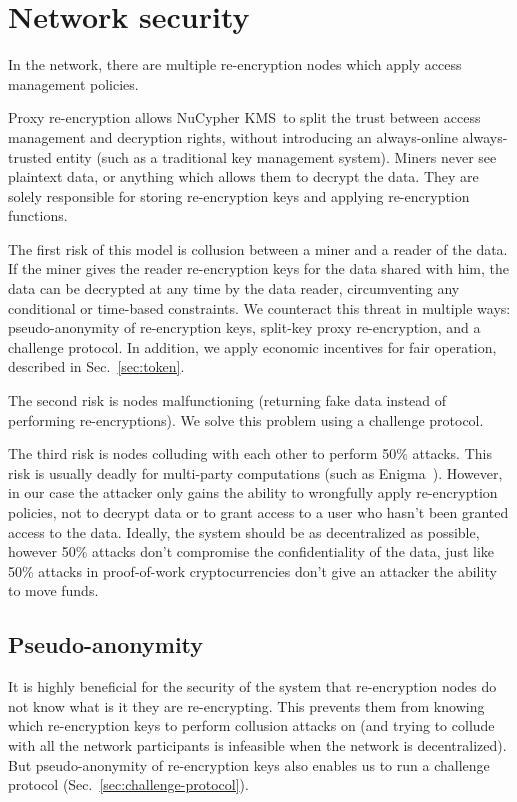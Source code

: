 \documentclass[longbibliography]{revtex4-1}
\newcommand{\kms}{NuCypher KMS}
\begin{document}
\section{Network security}

In the network, there are multiple re-encryption nodes which apply access management policies.

Proxy re-encryption allows \kms~to split the trust between access management and decryption rights,
without introducing an always-online always-trusted entity (such as a traditional key management system).
Miners never see plaintext data, or anything which allows them to decrypt the data.
They are solely responsible for storing re-encryption keys and applying re-encryption functions.

The first risk of this model is collusion between a miner and a reader of the data.
If the miner gives the reader re-encryption keys for the data shared with him,
the data can be decrypted at any time by the data reader, circumventing any conditional or time-based constraints.
We counteract this threat in multiple ways: pseudo-anonymity of re-encryption keys, split-key proxy re-encryption, and a challenge protocol.
In addition, we apply economic incentives for fair operation, described in Sec.~\ref{sec:token}.

The second risk is nodes malfunctioning (returning fake data instead of performing re-encryptions).
We solve this problem using a challenge protocol.

The third risk is nodes colluding with each other to perform 50\% attacks.
This risk is usually deadly for multi-party computations (such as Enigma~\cite{enigma}). However, in our case the attacker only gains the ability to wrongfully apply re-encryption policies, not to decrypt data or to grant access to a user who hasn't been granted access to the data.
Ideally, the system should be as decentralized as possible, however 50\% attacks don't compromise the confidentiality of the data, just like 50\% attacks in
proof-of-work cryptocurrencies don't give an attacker the ability to move funds.

\subsection{Pseudo-anonymity}

It is highly beneficial for the security of the system that re-encryption nodes do not know what is it they are re-encrypting.
This prevents them from knowing which re-encryption keys to perform collusion attacks on (and trying to collude with all the network participants
is infeasible when the network is decentralized).
But pseudo-anonymity of re-encryption keys also enables us to run a challenge protocol (Sec.~\ref{sec:challenge-protocol}).
\end{document}
